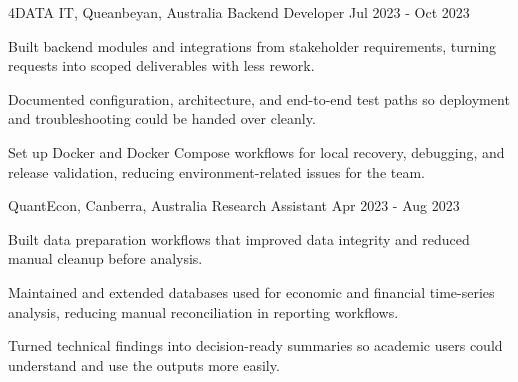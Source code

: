 \begin{cventries}
  \cventry
    {4DATA IT, Queanbeyan, Australia} %
    {Backend Developer} %
    {} %
    {Jul 2023 - Oct 2023} %
    {
      \begin{cvitems} %
        \item {Built backend modules and integrations from stakeholder requirements, turning requests into scoped deliverables with less rework.}
        \item {Documented configuration, architecture, and end-to-end test paths so deployment and troubleshooting could be handed over cleanly.}
        \item {Set up Docker and Docker Compose workflows for local recovery, debugging, and release validation, reducing environment-related issues for the team.}
      \end{cvitems}
    }

    
  \cventry
    {QuantEcon, Canberra, Australia} %
    {Research Assistant} %
    {} %
    {Apr 2023 - Aug 2023} %
    {
      \begin{cvitems} %
        \item {Built data preparation workflows that improved data integrity and reduced manual cleanup before analysis.}
        \item {Maintained and extended databases used for economic and financial time-series analysis, reducing manual reconciliation in reporting workflows.}
        \item {Turned technical findings into decision-ready summaries so academic users could understand and use the outputs more easily.}
      \end{cvitems}
    }
  

\end{cventries}
